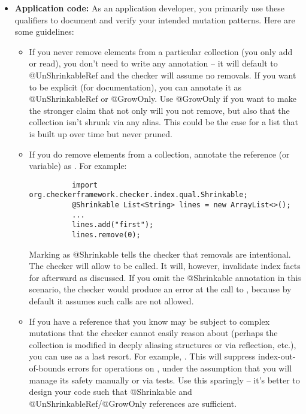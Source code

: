 \begin{itemize}
\item
  \textbf{Application code:}
  As an application developer, you primarily use these qualifiers to document and verify your intended mutation patterns. 
  Here are some guidelines:
  \begin{itemize}
    \item 
      If you never remove elements from a particular collection (you only add or read), you don’t need to write any 
      annotation – it will default to @UnShrinkableRef and the checker will assume no removals. If you want to be explicit 
      (for documentation), you can annotate it as @UnShrinkableRef or @GrowOnly. Use @GrowOnly if you want to make the stronger 
      claim that not only will you not remove, but also that the collection isn’t shrunk via any alias. This could be the 
      case for a list that is built up over time but never pruned.
    \item 
      If you do remove elements from a collection, annotate the reference (or variable) as . 
      For example:
        \begin{Verbatim}
          import org.checkerframework.checker.index.qual.Shrinkable;
          @Shrinkable List<String> lines = new ArrayList<>();
          ...
          lines.add("first");
          lines.remove(0);
        \end{Verbatim}
      Marking  as @Shrinkable tells the checker that removals are intentional. 
      The checker will allow  to be called. It will, however, invalidate index facts for 
       afterward as discussed. If you omit the @Shrinkable annotation in this scenario, the checker 
      would produce an error at the call to , because by default it assumes such calls are not allowed.
    \item 
      If you have a reference that you know may be subject to complex mutations that the checker cannot easily reason 
      about (perhaps the collection is modified in deeply aliasing structures or via reflection, etc.), you can use 
       as a last resort. For example, 
      . This will suppress index-out-of-bounds errors for operations 
      on , under the assumption that you will manage its safety manually or via tests. Use this 
      sparingly – it’s better to design your code such that @Shrinkable and @UnShrinkableRef/@GrowOnly references are sufficient.

\end{itemize}
\end{itemize}
